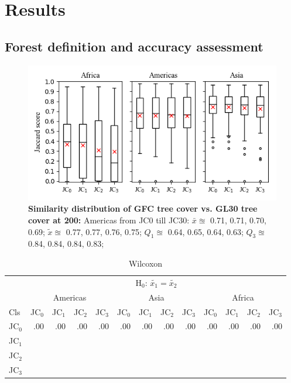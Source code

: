 \chapter{Results}
\label{ch:result}

	\section{Forest definition and accuracy assessment}
	\label{sec:forest_definition}

		\begin{figure}[ht]
			\centering
			\includegraphics[scale=1]{img/jaccard}
			\caption[Similarity distribution of \ac{GFC} tree cover vs. \ac{GL30} tree cover at 200]{\textbf{Similarity distribution of \ac{GFC} tree cover vs. \ac{GL30} tree cover at 200:} Americas from JC0 till JC30: $\bar{x}\approxeq$ 0.71, 0.71, 0.70, 0.69; $\tilde{x}\approxeq$ 0.77, 0.77, 0.76, 0.75; $Q_1\approxeq$ 0.64, 0.65, 0.64, 0.63; $Q_3\approxeq$ 0.84, 0.84, 0.84, 0.83;}
			\label{fig:jaccard}
		\end{figure}

		\begin{table}[ht]
			\centering
			\caption[Wilcoxon]{Wilcoxon}
			\label{tab:wilcoxon}
			\begin{tabular}{lrrrr|rrrr|rrrr}
				& \multicolumn{12}{c}{H$_0$: $\tilde{x_1}=\tilde{x_2}$} \\
				& \multicolumn{4}{c|}{Americas} & \multicolumn{4}{c|}{Asia} & \multicolumn{4}{c}{Africa} \\
				Cls & JC$_0$ & JC$_1$ & JC$_2$ & JC$_3$ & JC$_0$ & JC$_1$ & JC$_2$ & JC$_3$ & JC$_0$ & JC$_1$ & JC$_2$ & JC$_3$ \\\hline
				JC$_0$ & .00 & .00 & .00 & .00 & .00 & .00 & .00 & .00 & .00 & .00 & .00 & .00 \\
				JC$_1$ &  &  &  &  &  &  &  &  &  &  &  &  \\
				JC$_2$ &  &  &  &  &  &  &  &  &  &  &  &  \\
				JC$_3$ &  &  &  &  &  &  &  &  &  &  &  &  \\\hline
			\end{tabular}
		\end{table}

